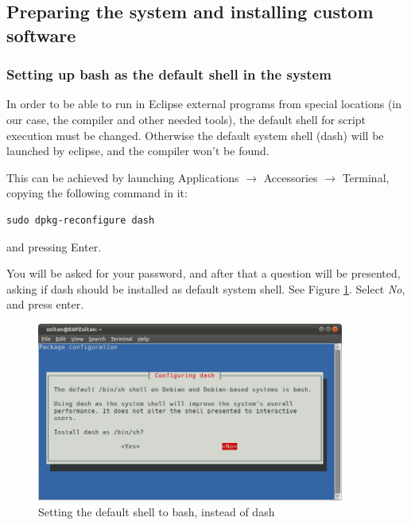 \documentclass[a4paper, 10pt]{article}
\begin{document}
\subsection{Preparing the system and installing custom software}


\subsubsection{Setting up bash as the default shell in the system}

In order to be able to run in Eclipse external programs from special locations
(in our case, the compiler and other needed tools),
the default shell for script execution must be changed.
Otherwise the default system shell (dash) will be launched by eclipse, 
and the compiler won't be found.

This can be achieved by launching Applications $\rightarrow$ Accessories $\rightarrow$ Terminal,
copying the following command in it:

\begin{verbatim}
sudo dpkg-reconfigure dash
\end{verbatim}

and pressing Enter.

You will be asked for your password, 
and after that a question will be presented, asking 
if dash should be installed as default system shell.
See Figure \ref{fig:set-dash-default}.
Select \emph{No}, and press enter.

    \begin{figure}[H]
    \centering
        \includegraphics[width=0.9\textwidth]{./png-install-guide/set-dash-default.png}
        \caption{Setting the default shell to bash, instead of dash}
        \label{fig:set-dash-default}
    \end{figure}
\end{document}
